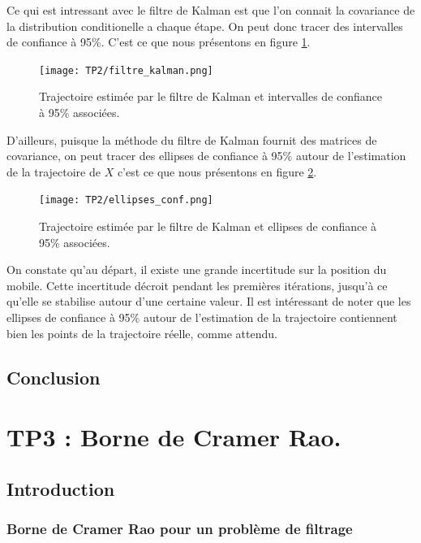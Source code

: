 \documentclass{article}
\begin{document}
Ce qui est intressant avec le filtre de Kalman est que l'on connait la covariance de la distribution
conditionelle a chaque étape. On peut donc tracer des 
intervalles de confiance à 95\%. C'est ce que nous présentons en figure \ref{ellipse}.

\begin{figure}[!htb]
   \centering
   \caption{Trajectoire estimée par le filtre de Kalman et intervalles de confiance à 95\% associées.}
   \label{ellipse}
   \texttt{[image: TP2/filtre\_kalman.png]}
\end{figure}

D'ailleurs, puisque la méthode du filtre de Kalman fournit des matrices de covariance, on 
peut tracer des ellipses de confiance à 95\% autour de l'estimation de la trajectoire
de $X$ c'est ce que nous présentons en figure \ref{ellipse_conf}. 

\begin{figure}[!htb]
   \centering
   \caption{Trajectoire estimée par le filtre de Kalman et ellipses de confiance à 95\% associées.}
   \label{ellipse_conf}
   \texttt{[image: TP2/ellipses\_conf.png]}
\end{figure}

On constate qu'au départ, il existe une grande incertitude sur la position du mobile.
Cette incertitude décroit pendant les premières itérations, jusqu'à ce qu'elle se stabilise autour d'une certaine valeur.
Il est intéressant de noter que les ellipses de confiance à 95\% autour de 
l'estimation de la trajectoire contiennent bien les points de la trajectoire réelle,
comme attendu.
\subsection{Conclusion}



\newpage
\newpage

\section{TP3 : Borne de Cramer Rao.}
\subsection{Introduction}
\subsubsection{Borne de Cramer Rao pour un problème de filtrage}
\end{document}
